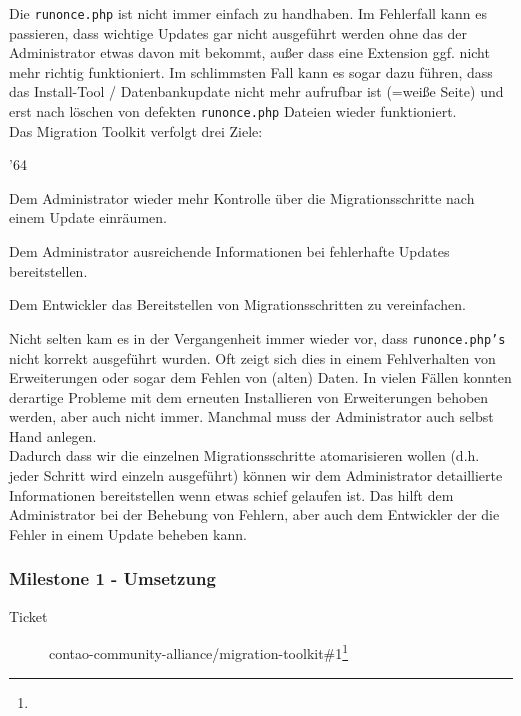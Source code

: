 \documentclass[
paper=a4,
draft=false,%
fontsize=10pt%
]{scrartcl}
\begin{document}
Die \texttt{runonce.php} ist nicht immer einfach zu handhaben. Im Fehlerfall kann es passieren, dass wichtige Updates gar nicht ausgeführt werden ohne das der Administrator etwas davon mit bekommt, außer dass eine Extension ggf. nicht mehr richtig funktioniert. Im schlimmsten Fall kann es sogar dazu führen, dass das Install-Tool / Datenbankupdate nicht mehr aufrufbar ist (=weiße Seite) und erst nach löschen von defekten \texttt{runonce.php} Dateien wieder funktioniert.\\
Das Migration Toolkit verfolgt drei Ziele:

\begin{dinglist}{'64}
\item Dem Administrator wieder mehr Kontrolle über die Migrationsschritte nach einem Update einräumen.
\item Dem Administrator ausreichende Informationen bei fehlerhafte Updates bereitstellen.
\item Dem Entwickler das Bereitstellen von Migrationsschritten zu vereinfachen.
\end{dinglist}

Nicht selten kam es in der Vergangenheit immer wieder vor, dass \texttt{runonce.php's} nicht korrekt ausgeführt wurden. Oft zeigt sich dies in einem Fehlverhalten von Erweiterungen oder sogar dem Fehlen von (alten) Daten. In vielen Fällen konnten derartige Probleme mit dem erneuten Installieren von Erweiterungen behoben werden, aber auch nicht immer. Manchmal muss der Administrator auch selbst Hand anlegen.\\
Dadurch dass wir die einzelnen Migrationsschritte atomarisieren wollen (d.h. jeder Schritt wird einzeln ausgeführt) können wir dem Administrator detaillierte Informationen bereitstellen wenn etwas schief gelaufen ist. Das hilft dem Administrator bei der Behebung von Fehlern, aber auch dem Entwickler der die Fehler in einem Update beheben kann.

\subsubsection{Milestone 1 - Umsetzung}
\label{subsec:mtk-milestone-1}

\begin{description}
\item[Ticket] contao-community-alliance/migration-toolkit\#1\footnote{}
\end{description}
\end{document}
